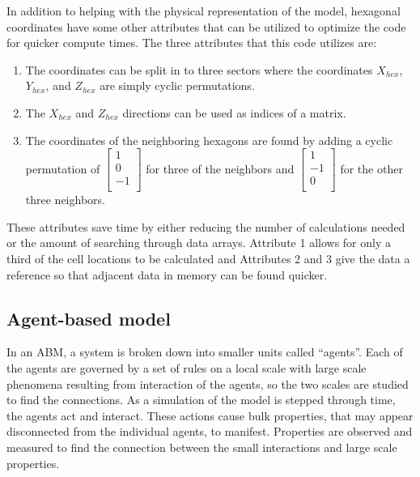 In addition to helping with the physical representation of the model, hexagonal coordinates have some other attributes that can be utilized to optimize the code for quicker compute times. The three attributes that this code utilizes are:
\begin{enumerate} 
    \item The coordinates can be split in to three sectors where the coordinates $X_{hex}$, $Y_{hex}$, and $Z_{hex}$ are simply cyclic permutations.
    \item The $X_{hex}$ and $Z_{hex}$ directions can be used as indices of a matrix.
    \item The coordinates of the neighboring hexagons are found by adding a cyclic permutation of 
        $\left [
            \begin{array}{c}
                1 \\
                0 \\
                -1\\
            \end{array}
        \right ]$
        for three of the neighbors and
        $\left [ 
            \begin{array}{c}
                1 \\
                -1 \\
                0\\
            \end{array}
        \right ]$
        for the other three neighbors.
\end{enumerate}
These attributes save time by either reducing the number of calculations needed or the amount of searching through data arrays. Attribute 1 allows for only a third of the cell locations to be calculated and Attributes 2 and 3 give the data a reference so that adjacent data in memory can be found quicker.

\subsection{Agent-based model} \label{ABM}

In an ABM, a system is broken down into smaller units called ``agents''. Each of the agents are governed by a set of rules on a local scale with large scale phenomena resulting from interaction of the agents, so the two scales are studied to find the connections. As a simulation of the model is stepped through time, the agents act and interact. These actions cause bulk properties, that may appear disconnected from the individual agents, to manifest. Properties are observed and measured to find the connection between the small interactions and large scale properties.

